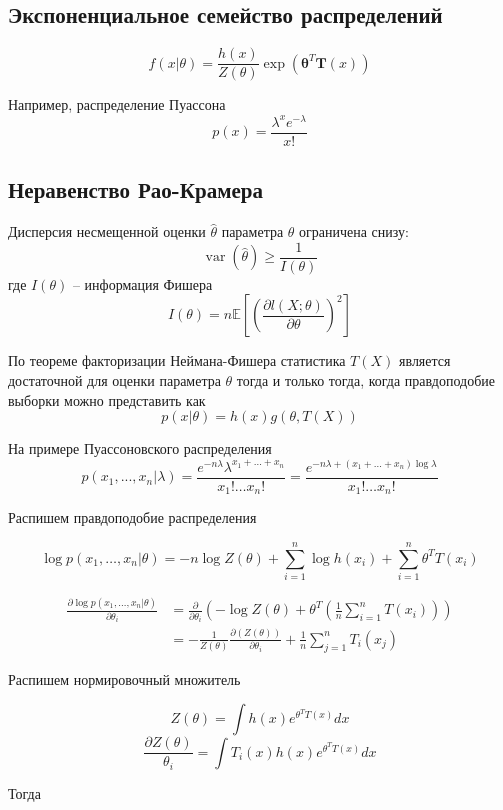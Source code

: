 \documentclass[
paper = a4,
fontsize = 12pt,
headinclude = true,
open = right,
twoside = true,
BCOR = 10mm,
toc = listofnumbered,
toc = bibnumbered,
numbers = noendperiod
]{scrreprt}
\begin{document}
	
	\subsection*{Экспоненциальное семейство распределений}
	$$f(x|\theta) = \frac{h(x)}{Z(\theta)}\exp\left(\pmb{\theta}^{T}\mathbf{T}(x)\right)$$
	
	Например, распределение Пуассона
	$$p(x) = \frac{\lambda^{x}e^{-\lambda}}{x!}$$
	
	
	
	
	\subsection*{Неравенство Рао-Крамера}
	Дисперсия несмещенной оценки $\hat{\theta}$ параметра $\theta$ ограничена снизу:
	$$\operatorname{var}(\hat{\theta}) \geq \frac{1}{I(\theta)}$$
	где $I(\theta)$ -- информация Фишера
	$$I(\theta) = n\mathbb{E}\left[\left(\frac{\partial l(X;\theta)}{\partial\theta}\right)^{2}\right]$$
	
	
	По теореме факторизации Неймана-Фишера статистика $T(X)$ является достаточной для оценки параметра $\theta$ тогда и только тогда, когда правдоподобие выборки можно представить как
	$$p(x|\theta) = h(x)g(\theta, T(X))$$
	
	На примере Пуассоновского распределения
	$$p(x_{1}, ..., x_{n}|\lambda) = \frac{e^{-n\lambda}\lambda^{x_{1} + \dots + x_{n}}}{x_{1}!\dots x_{n}!} = \frac{e^{-n\lambda + (x_{1} + \dots + x_{n})\log	\lambda}}{x_{1}!\dots x_{n}!}$$
	

	Распишем правдоподобие распределения
	
	$$\log p(x_{1}, \dots, x_{n}|\theta) = -n\log Z(\theta) + \sum_{i = 1}^{n}\log h(x_{i}) + \sum_{i = 1}^{n}\theta^{T}T(x_{i})$$
	
	\begin{align*}
		\frac{\partial \log p(x_{1}, \dots, x_{n}|\theta)}{\partial \theta_{i}} 
		&= \frac{\partial}{\partial\theta_{i}}\left(-\log Z(\theta) + \theta^{T}\left(\frac{1}{n}\sum_{i = 1}^{n}T(x_{i})\right)\right) \\
		&= -\frac{1}{Z(\theta)}\frac{\partial(Z(\theta))}{\partial\theta_{i}} + \frac{1}{n}\sum_{j = 1}^{n}T_{i}(x_{j})
	\end{align*}

	Распишем нормировочный множитель
	
	$$Z(\theta) = \int h(x)e^{\theta^{T}T(x)}dx$$
	$$\frac{\partial{Z(\theta)}}{\theta_{i}} = \int T_{i}(x)h(x)e^{\theta^{T}T(x)}dx$$
	
	Тогда
	
\end{document}

